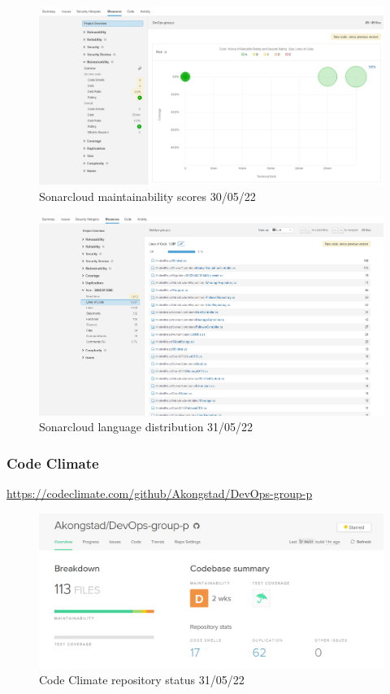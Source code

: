 \begin {figure}[H]
    \centering
    \includegraphics[scale=0.41]{images/analysis_tools/analys debt.PNG}
    \caption{Sonarcloud maintainability scores 30/05/22}
    \label{fig:cloudMaintainability}
\end{figure}

\begin {figure}[H]
    \centering
    \includegraphics[scale=0.39]{images/analysis_tools/SonarCloudCsharp.PNG}
    \caption{Sonarcloud language distribution 31/05/22}
    \label{fig:cloudLangDis}
\end{figure}

\subsubsection{Code Climate}
\label{app:codeClimate}
\href{https://codeclimate.com/github/Akongstad/DevOps-group-p}{https://codeclimate.com/github/Akongstad/DevOps-group-p}

\begin {figure}[H]
    \centering
    \includegraphics[scale=0.50]{images/analysis_tools/codeClimateDash.PNG}
    \caption{Code Climate repository status 31/05/22}
    \label{fig:codeClimateDash}
\end{figure}

